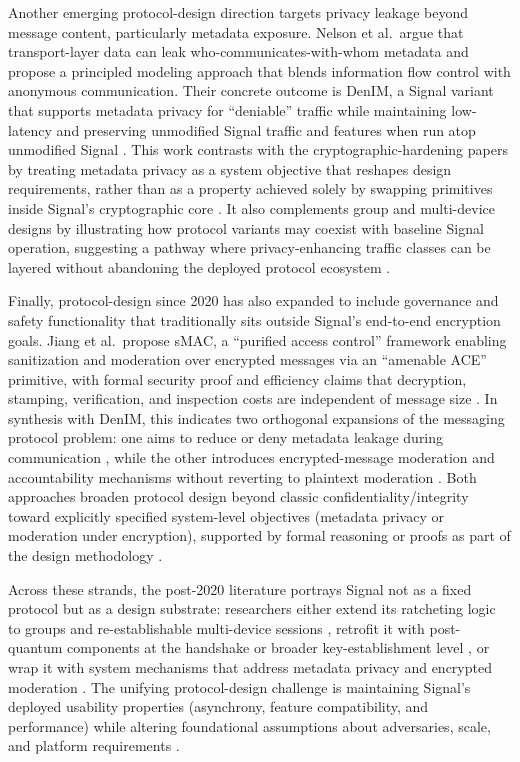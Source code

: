 Another emerging protocol-design direction targets privacy leakage beyond message content, particularly metadata exposure. Nelson et al.\ argue that transport-layer data can leak who-communicates-with-whom metadata and propose a principled modeling approach that blends information flow control with anonymous communication. Their concrete outcome is DenIM, a Signal variant that supports metadata privacy for ``deniable'' traffic while maintaining low-latency and preserving unmodified Signal traffic and features when run atop unmodified Signal \cite{nelson2024}. This work contrasts with the cryptographic-hardening papers by treating metadata privacy as a system objective that reshapes design requirements, rather than as a property achieved solely by swapping primitives inside Signal’s cryptographic core \cite{nelson2024,angom2025}. It also complements group and multi-device designs by illustrating how protocol variants may coexist with baseline Signal operation, suggesting a pathway where privacy-enhancing traffic classes can be layered without abandoning the deployed protocol ecosystem \cite{nelson2024}.

Finally, protocol-design since 2020 has also expanded to include governance and safety functionality that traditionally sits outside Signal’s end-to-end encryption goals. Jiang et al.\ propose sMAC, a ``purified access control'' framework enabling sanitization and moderation over encrypted messages via an ``amenable ACE'' primitive, with formal security proof and efficiency claims that decryption, stamping, verification, and inspection costs are independent of message size \cite{jiang2024}. In synthesis with DenIM, this indicates two orthogonal expansions of the messaging protocol problem: one aims to reduce or deny metadata leakage during communication \cite{nelson2024}, while the other introduces encrypted-message moderation and accountability mechanisms without reverting to plaintext moderation \cite{jiang2024}. Both approaches broaden protocol design beyond classic confidentiality/integrity toward explicitly specified system-level objectives (metadata privacy or moderation under encryption), supported by formal reasoning or proofs as part of the design methodology \cite{nelson2024,jiang2024}.

Across these strands, the post-2020 literature portrays Signal not as a fixed protocol but as a design substrate: researchers either extend its ratcheting logic to groups and re-establishable multi-device sessions \cite{basem2023,ayed2025,bobrysheva2021}, retrofit it with post-quantum components at the handshake or broader key-establishment level \cite{angom2025,bobrysheva2021,sharma2023}, or wrap it with system mechanisms that address metadata privacy and encrypted moderation \cite{nelson2024,jiang2024}. The unifying protocol-design challenge is maintaining Signal’s deployed usability properties (asynchrony, feature compatibility, and performance) while altering foundational assumptions about adversaries, scale, and platform requirements \cite{basem2023,nelson2024,ayed2025,angom2025}.


